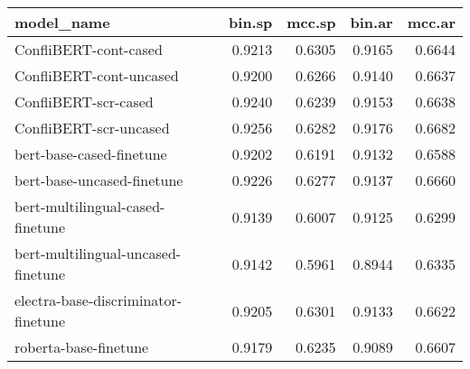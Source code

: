 \begin{table}[ht]
\centering
\begin{tabular}{lrrrr}
  \hline
model\_name & bin.sp & mcc.sp & bin.ar & mcc.ar \\ 
  \hline
ConfliBERT-cont-cased & 0.9213 & 0.6305 & 0.9165 & 0.6644 \\ 
  ConfliBERT-cont-uncased & 0.9200 & 0.6266 & 0.9140 & 0.6637 \\ 
  ConfliBERT-scr-cased & 0.9240 & 0.6239 & 0.9153 & 0.6638 \\ 
  ConfliBERT-scr-uncased & 0.9256 & 0.6282 & 0.9176 & 0.6682 \\ 
  bert-base-cased-finetune & 0.9202 & 0.6191 & 0.9132 & 0.6588 \\ 
  bert-base-uncased-finetune & 0.9226 & 0.6277 & 0.9137 & 0.6660 \\ 
  bert-multilingual-cased-finetune & 0.9139 & 0.6007 & 0.9125 & 0.6299 \\ 
  bert-multilingual-uncased-finetune & 0.9142 & 0.5961 & 0.8944 & 0.6335 \\ 
  electra-base-discriminator-finetune & 0.9205 & 0.6301 & 0.9133 & 0.6622 \\ 
  roberta-base-finetune & 0.9179 & 0.6235 & 0.9089 & 0.6607 \\ 
   \hline
\end{tabular}
\end{table}
